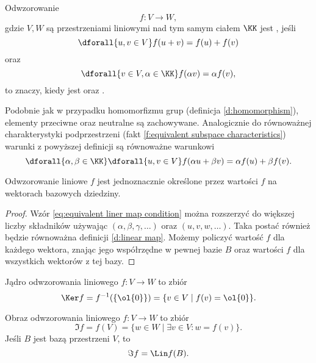 \begin{definition}
    \label{d:linear map}
    Odwzorowanie
    \[ f : V \to W, \]
    gdzie $V, W$ są przestrzeniami liniowymi nad tym samym ciałem $\KK$ jest , jeśli
    \[ \dforall{u, v \in V} f(u + v) = f(u) + f(v) \]
    oraz
    \[ \dforall{v \in V, \alpha \in \KK} f(\alpha v) = \alpha f(v), \]
    to znaczy, kiedy jest  oraz .
\end{definition}

Podobnie jak w przypadku homomorfizmu grup (definicja \ref{d:homomorphism}), elementy przeciwne oraz neutralne są zachowywane. Analogicznie do równoważnej charakterystyki podprzestrzeni (fakt \ref{f:equivalent subspace characteristics}) warunki z powyższej definicji są równoważne warunkowi
\begin{equation}
    \label{eq:equivalent liner map condition}
    \dforall{\alpha, \beta \in \KK}\dforall{u, v \in V} f(\alpha u + \beta v) = \alpha f(u) + \beta f(v).
\end{equation}

\begin{corollary}
    \label{c:linear map is unique by the values f(B)}
    Odwzorowanie liniowe $f$ jest jednoznacznie określone przez wartości $f$ na wektorach bazowych dziedziny.
\end{corollary}
\begin{proof}
    Wzór \ref{eq:equivalent liner map condition} można rozszerzyć do większej liczby składników używając $(\alpha, \beta, \gamma, \ldots)$ oraz $(u, v, w, \ldots)$. Taka postać również będzie równoważna definicji \ref{d:linear map}. Możemy policzyć wartość $f$ dla każdego wektora, znając jego współrzędne w pewnej bazie $B$ oraz wartości $f$ dla wszystkich wektorów z tej bazy.
\end{proof}

\begin{definition}
    Jądro odwzorowania liniowego $f : V \to W$ to zbiór
    \[ \Ker f = f^{-1}(\{\ol{0}\}) = \{v \in V \mid f(v) = \ol{0}\}. \]
\end{definition}

\begin{definition}
    Obraz odwzorowania liniowego $f : V \to W$ to zbiór
    \[ \Im f = f(V) = \{w \in W \mid \exists v \in V : w = f(v)\}. \]
    Jeśli $B$ jest bazą przestrzeni $V$, to
    \[ \Im f = \Lin f(B). \]
\end{definition}

